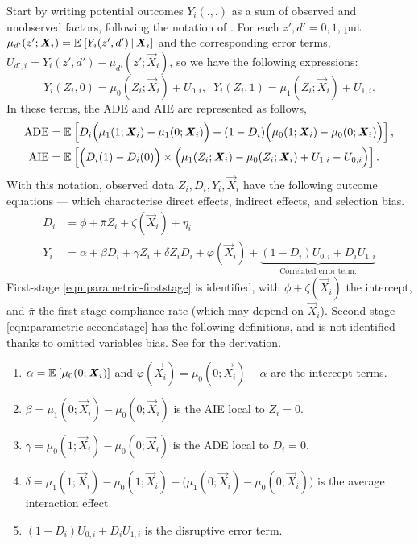 Start by writing potential outcomes $Y_i(., .)$ as a sum of observed and unobserved factors, following the notation of \cite{heckman2005structural}.
For each $z',d' = 0,1$, put $\mu_{d'}(z'; \boldsymbol{\mathit{X}}_i) = \mathbb{E}_{} \left[ Y_i(z', d') \, \middle\vert \, \boldsymbol{\mathit{X}}_i \right]$ and the corresponding error terms, $U_{d', i} = Y_i(z', d') - \mu_{d'}(z'; \vec X_i)$, so we have the following expressions:
\[ Y_i(Z_i, 0)  = \mu_{0}(Z_i; \vec X_i) + U_{0,i}, \;\;
    Y_i(Z_i, 1) = \mu_{1}(Z_i; \vec X_i) + U_{1,i}. \]
In these terms, the ADE and AIE are represented as follows,
\begin{align*}
    \text{ADE}
    &= \mathbb{E}_{} \left[  D_i \Big( \mu_{1}(1; \boldsymbol{\mathit{X}}_i) - \mu_{1}(0; \boldsymbol{\mathit{X}}_i)\Big)
        + (1 - D_i) \Big( \mu_{0}(1; \boldsymbol{\mathit{X}}_i) - \mu_{0}(0; \boldsymbol{\mathit{X}}_i)\Big) \right], \\
    \text{AIE}
        &= \mathbb{E}_{} \left[ \Big( D_i(1) - D_i(0) \Big)
        \times \Big( \mu_1(Z_i; \boldsymbol{\mathit{X}}_i) - \mu_0(Z_i; \boldsymbol{\mathit{X}}_i) + U_{1,i} - U_{0,i}\Big)  \right].
\end{align*}
With this notation, observed data $Z_i, D_i, Y_i, \vec X_i$ have the following outcome equations --- which characterise direct effects, indirect effects, and selection bias.
\begin{align}
    \label{eqn:parametric-firststage}
    D_i &= \phi + \bar \pi Z_i + \zeta(\vec X_i) + \eta_i  \\
    \label{eqn:parametric-secondstage}
    Y_i &= \alpha + \beta D_i + \gamma Z_i + \delta Z_i D_i
    + \varphi(\vec X_i)
    + \underbrace{\left(1 - D_i \right)U_{0,i} + D_i U_{1,i}}_{
        \text{Correlated error term.}}
\end{align}
First-stage \eqref{eqn:parametric-firststage} is identified, with $\phi + \zeta(\vec X_i)$ the intercept, and $\bar \pi$ the first-stage compliance rate (which may depend on $\vec X_i$).
Second-stage \eqref{eqn:parametric-secondstage} has the following definitions, and is not identified thanks to omitted variables bias.
See  for the derivation.
\begin{enumerate}[label=\textbf{(\alph*)}]
    \item $\alpha = \mathbb{E}_{} \left[ \mu_0(0; \boldsymbol{\mathit{X}}_i) \right]$ and $\varphi(\vec X_i) = \mu_0(0; \vec X_i) - \alpha$ are the intercept terms.
    \item $\beta = \mu_1(0; \vec X_i) - \mu_0(0; \vec X_i)$ is the AIE local to $Z_i = 0$.
    \item $\gamma = \mu_0(1; \vec X_i) - \mu_0(0; \vec X_i)$ is the ADE local to $D_i = 0$.
    \item $\delta = \mu_1(1; \vec X_i) - \mu_0(1; \vec X_i) - \big( \mu_1(0; \vec X_i) - \mu_0(0; \vec X_i) \big)$ is the average interaction effect.
    \item $\left( 1 - D_i \right) U_{0,i} + D_i U_{1,i}$ is the disruptive error term.
\end{enumerate}

